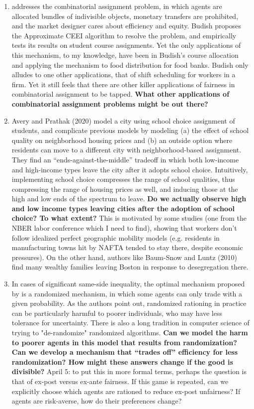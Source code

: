 \documentclass[JEL]{AEA}
\begin{document}
\begin{enumerate}    
    \item \cite{budish-2011} addresses the combinatorial assignment problem, in which agents are allocated bundles of indivisible objects, monetary transfers are prohibited, and the market designer cares about efficiency and equity. Budish proposes the Approximate CEEI algorithm to resolve the problem, and empirically tests its results on student course assignments. Yet the only applications of this mechanism, to my knowledge, have been in Budish's course allocation and \cite{prendergast-2017} applying the mechanism to food distribution for food banks. Budish only alludes to one other applications, that of shift scheduling for workers in a firm. Yet it still feels that there are other killer applications of fairness in combinatorial assignment to be tapped. \textbf{What other applications of combinatorial assignment problems might be out there?}
    
    \item Avery and Prathak (2020) model a city using school choice assignment of students, and complicate previous models by modeling (a) the effect of school quality on neighborhood housing prices and (b) an outside option where residents can move to a different city with neighborhood-based assignment. They find an “ends-against-the-middle” tradeoff in which both low-income and high-income types leave the city after it adopts school choice. Intuitively, implementing school choice compresses the range of school qualities, thus compressing the range of housing prices as well, and inducing those at the high and low ends of the spectrum to leave. \textbf{Do we actually observe high and low income types leaving cities after the adoption of school choice? To what extent?} This is motivated by some studies (one from the NBER labor conference which I need to find), showing that workers don’t follow idealized perfect geographic mobility models (e.g. residents in manufacturing towns hit by NAFTA tended to stay there, despite economic pressures). On the other hand, authors like Baum-Snow and Luntz (2010) find many wealthy families leaving Boston in response to desegregation there.
    
    \item In cases of significant same-side inequality, the optimal mechanism proposed by \cite{dworczak-2020} is a randomized mechanism, in which some agents can only trade with a given probability. As the authors point out, randomized rationing in practice can be particularly harmful to poorer individuals, who may have less tolerance for uncertainty. There is also a long tradition in computer science of trying to "de-randomize" randomized algorithms. \textbf{Can we model the harm to poorer agents in this model that results from randomization? Can we develop a mechanism that ``trades off'' efficiency for less randomization? How might these answers change if the good is divisible?} April 5: to put this in more formal terms, perhaps the question is that of ex-post versus ex-ante fairness. If this game is repeated, can we explicitly choose which agents are rationed to reduce ex-post unfairness? If agents are risk-averse, how do their preferences change?
    

\end{enumerate}
\end{document}
